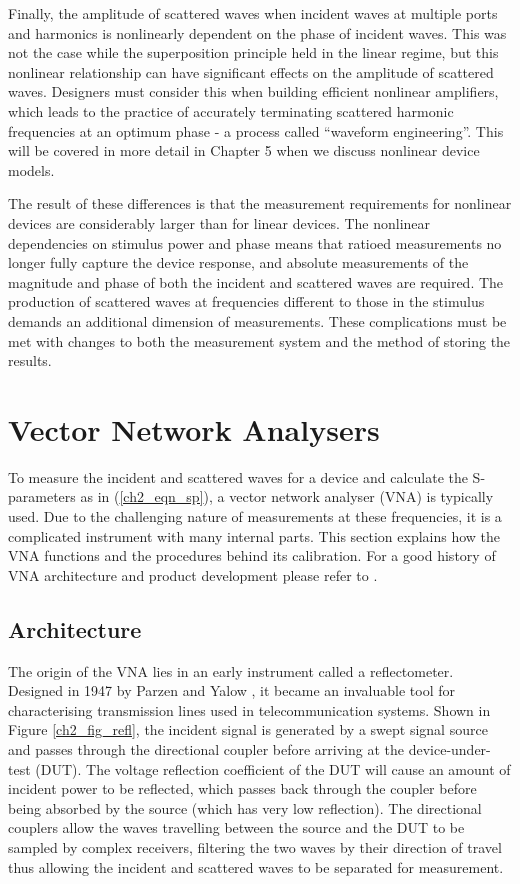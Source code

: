 \documentclass[../thesis/thesis.tex]{subfiles}
\begin{document}
Finally, the amplitude of scattered waves when incident waves at multiple ports and harmonics is nonlinearly dependent on the phase of incident waves. This was not the case while the superposition principle held in the linear regime, but this nonlinear relationship can have significant effects on the amplitude of scattered waves. Designers must consider this when building efficient nonlinear amplifiers, which leads to the practice of accurately terminating scattered harmonic frequencies at an optimum phase - a process called ``waveform engineering''. This will be covered in more detail in Chapter 5 when we discuss nonlinear device models. 

The result of these differences is that the measurement requirements for nonlinear devices are considerably larger than for linear devices. The nonlinear dependencies on stimulus power and phase means that ratioed measurements no longer fully capture the device response, and absolute measurements of the magnitude and phase of both the incident and scattered waves are required. The production of scattered waves at frequencies different to those in the stimulus demands an additional dimension of measurements. These complications must be met with changes to both the measurement system and the method of storing the results.

\section{Vector Network Analysers}

To measure the incident and scattered waves for a device and calculate the S-parameters as in (\ref{ch2_eqn_sp}), a vector network analyser (VNA) is typically used. Due to the challenging nature of measurements at these frequencies, it is a complicated instrument with many internal parts. This section explains how the VNA functions and the procedures behind its calibration. For a good history of VNA architecture and product development please refer to \cite{Teppati_2013,Dunsmore_2012,Rytting_2008}.

\subsection{Architecture}

The origin of the VNA lies in an early instrument called a reflectometer. Designed in 1947 by Parzen and Yalow \cite{Parzen_1947}, it became an invaluable tool for characterising transmission lines used in telecommunication systems. Shown in Figure \ref{ch2_fig_refl}, the incident signal is generated by a swept signal source and passes through the directional coupler before arriving at the device-under-test (DUT). The voltage reflection coefficient of the DUT will cause an amount of incident power to be reflected, which passes back through the coupler before being absorbed by the source (which has very low reflection). The directional couplers allow the waves travelling between the source and the DUT to be sampled by complex receivers, filtering the two waves by their direction of travel thus allowing the incident and scattered waves to be separated for measurement. 
\end{document}
